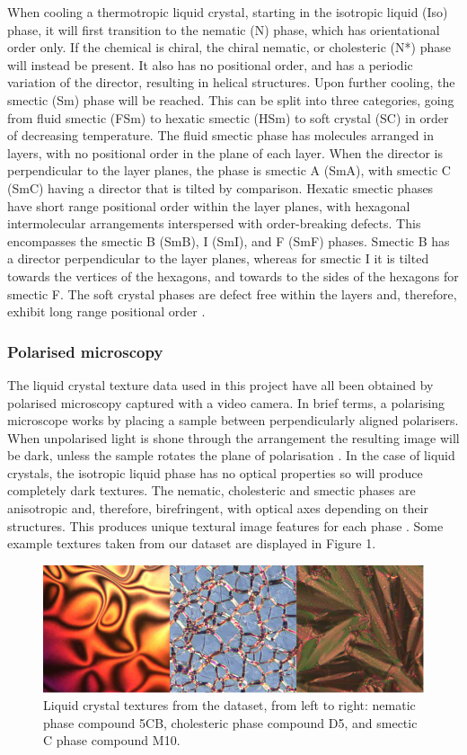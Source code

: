 \documentclass[12pt]{article}
\begin{document}
When cooling a thermotropic liquid crystal, starting in the isotropic liquid (Iso) phase, it will first transition to the nematic (N) phase, which has orientational order only. If the chemical is chiral, the chiral nematic, or cholesteric (N*) phase will instead be present. It also has no positional order, and has a periodic variation of the director, resulting in helical structures. Upon further cooling, the smectic (Sm) phase will be reached. This can be split into three categories, going from fluid smectic (FSm) to hexatic smectic (HSm) to soft crystal (SC) in order of decreasing temperature. The fluid smectic phase has molecules arranged in layers, with no positional order in the plane of each layer. When the director is perpendicular to the layer planes, the phase is smectic A (SmA), with smectic C (SmC) having a director that is tilted by comparison. Hexatic smectic phases have short range positional order within the layer planes, with hexagonal intermolecular arrangements interspersed with order-breaking defects. This encompasses the smectic B (SmB), I (SmI), and F (SmF) phases. Smectic B has a director perpendicular to the layer planes, whereas for smectic I it is tilted towards the vertices of the hexagons, and towards to the sides of the hexagons for smectic F. The soft crystal phases are defect free within the layers and, therefore, exhibit long range positional order \cite{Dierking03}.
\subsubsection{Polarised microscopy}
The liquid crystal texture data used in this project have all been obtained by polarised microscopy captured with a video camera. In brief terms, a polarising microscope works by placing a sample between perpendicularly aligned polarisers. When unpolarised light is shone through the arrangement the resulting image will be dark, unless the sample rotates the plane of polarisation \cite{Dierking03}. In the case of liquid crystals, the isotropic liquid phase has no optical properties so will produce completely dark textures. The nematic, cholesteric and smectic phases are anisotropic and, therefore, birefringent, with optical axes depending on their structures. This produces unique textural image features for each phase \cite{Dierking03}. Some example textures taken from our dataset are displayed in Figure 1.

\begin{figure}[!htb]
\centering
\includegraphics[width=6in]{images/texture_samples.png}
\caption{Liquid crystal textures from the dataset, from left to right: nematic phase compound 5CB, cholesteric phase compound D5, and smectic C phase compound M10.}
\end{figure}
\end{document}
